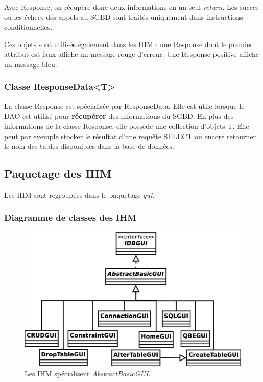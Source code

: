Avec Response, on récupère donc deux informations en un seul \textit{return}.
Les succès ou les échecs des appels au SGBD sont traités uniquement dans instructions conditionnelles.

Ces objets sont utilisés également dans les IHM : une Response dont le premier attribut est faux affiche un message rouge d'erreur.
Une Response positive affiche un message bleu.

\subsubsection{Classe ResponseData<T>}
La classe Response est spécialisée par ResponseData.
Elle est utile lorsque le DAO est utilisé pour \textbf{récupérer} des informations du SGBD.
En plus des informations de la classe Response, elle possède une collection d'objets T.
Elle peut par exemple stocker le résultat d'une requête SELECT ou encore retourner le nom des tables disponibles dans la base de données.

\subsection{Paquetage des IHM}
Les IHM sont regroupées dans le paquetage \textit{gui}.

\subsubsection{Diagramme de classes des IHM}
\begin{figure}[!h]
\centering
\includegraphics[width=14cm]{images/gui.eps}
\caption{Les IHM spécialisent \textit{AbstractBasicGUI}.}
\label{hierarchie_des_ihm}
\end{figure}

